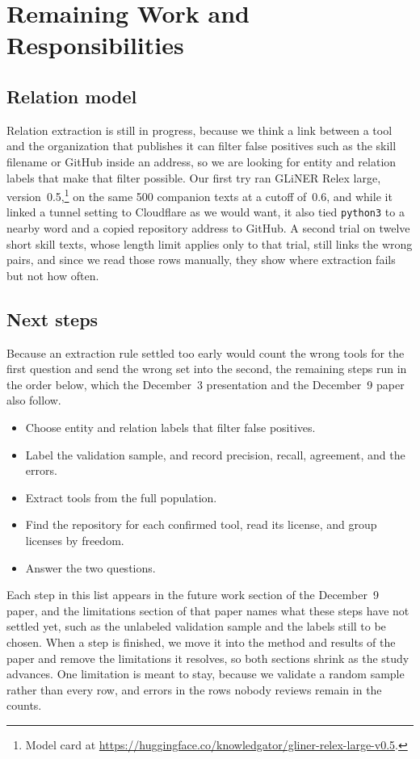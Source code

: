 \section{Remaining Work and Responsibilities}

\subsection{Relation model}

Relation extraction is still in progress, because we think a link between a tool and the organization that publishes it can filter false positives such as the skill filename or GitHub inside an address, so we are looking for entity and relation labels that make that filter possible.
Our first try ran GLiNER Relex large, version~0.5,\footnote{Model card at \url{https://huggingface.co/knowledgator/gliner-relex-large-v0.5}.} on the same 500 companion texts at a cutoff of~$0.6$, and while it linked a tunnel setting to Cloudflare as we would want, it also tied \texttt{python3} to a nearby word and a copied repository address to GitHub.
A second trial on twelve short skill texts, whose length limit applies only to that trial, still links the wrong pairs, and since we read those rows manually, they show where extraction fails but not how often.

\subsection{Next steps}

Because an extraction rule settled too early would count the wrong tools for the first question and send the wrong set into the second, the remaining steps run in the order below, which the December~3 presentation and the December~9 paper also follow.

\begin{itemize}
  \item Choose entity and relation labels that filter false positives.
  \item Label the validation sample, and record precision, recall, agreement, and the errors.
  \item Extract tools from the full population.
  \item Find the repository for each confirmed tool, read its license, and group licenses by freedom.
  \item Answer the two questions.
\end{itemize}

Each step in this list appears in the future work section of the December~9 paper, and the limitations section of that paper names what these steps have not settled yet, such as the unlabeled validation sample and the labels still to be chosen.
When a step is finished, we move it into the method and results of the paper and remove the limitations it resolves, so both sections shrink as the study advances.
One limitation is meant to stay, because we validate a random sample rather than every row, and errors in the rows nobody reviews remain in the counts.


